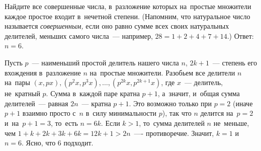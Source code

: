 \problem
Найдите все совершенные числа, в~разложение которых на~простые множители каждое
простое входит в~нечетной степени.
(Напомним, что натуральное число называется \emph{совершенным,} если оно равно
сумме всех своих натуральных делителей, меньших самого числа~---
например, $28 = 1 + 2 + 4 + 7 + 14$.)
\solution
Ответ: $n = 6$.
\par
Пусть $p$~--- наименьший простой делитель нашего числа $n$, $2 k + 1$~---
степень его вхождения в~разложение $n$ на~простые множители.
Разобьем все делители $n$ на~пары
$(x, px), (p^2 x, p^3 x), \ldots, (p^{2k}x, p^{2 k + 1}x)$,
где $x$~--- делитель, не~кратный $p$.
Сумма в~каждой паре кратна $p + 1$, а~значит, и~общая сумма делителей~---
равная $2n$~--- кратна $p + 1$.
Это возможно только при $p = 2$ (иначе $p + 1$ взаимно просто с~$n$ в~силу
минимальности $p$), так что $n$ делится на~$p = 2$ и~на~$p + 1 = 3$, то~есть
$n = 6 k$.
Если $k > 1$, то~сумма делителей $n$ не~меньше, чем
$1 + k + 2 k + 3 k + 6 k = 12 k + 1 > 2 n$~---- противоречие.
Значит, $k = 1$ и~$n = 6$.
Ясно, что 6 подходит.
\endproblem
